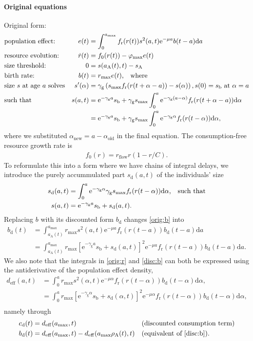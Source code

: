 \documentclass[11pt]{scrartcl}
\renewcommand{\phi}{\varphi}
\newcommand{\e}{\mathrm{e}}
\renewcommand{\d}{\mathrm{d}}
\newcommand{\bd}{b_\mathrm{d}}
\newcommand{\cd}{c_\mathrm{d}}
\newcommand{\sd}{s_\mathrm{d}}
\newcommand{\fr}{f_\mathrm{r}}
\newcommand{\rmax}{r_\mathrm{max}}
\newcommand{\amax}{{a_\mathrm{max}}}
\newcommand{\szmax}{{s_\mathrm{max}}}
\newcommand{\fmax}{\phi_\mathrm{max}}
\newcommand{\sza}{s_\mathrm{A}}
\newcommand{\szb}{s_\mathrm{b}}
\newcommand{\aA}{a_\mathrm{A}}
\newcommand{\ra}{\rho_\mathrm{A}}
\newcommand{\deff}{d_\mathrm{eff}}
\renewcommand{\gg}{\gamma_\mathrm{g}}
\begin{document}
\paragraph{Original equations}
Original form:
\begin{align}
  &\mbox{population effect:}& e(t)&=\int_0^\amax\fr(r(t))s^2(a,t)\e^{-\mu a}b(t-a)\d a\label{orig:pe}\\
  &\mbox{resource evolution:}&\dot r(t)&=f_0(r(t))-\fmax e(t)\label{orig:r}\\
  &\mbox{size threshold:}&0&=s(\aA(t),t)-\sza\label{orig:aa}\\
  &\mbox{birth rate:}&b(t)&=\rmax e(t)\label{orig:b}\mbox{,\quad where}\\
  &\mbox{size $s$ at age $a$ solves}&s'(\alpha)&=\gg \left(\szmax\fr(r(t+\alpha-a))-s(\alpha)\right),s(0)=\szb\mbox{\ at $\alpha=a$}\nonumber\\
  &\mbox{such that}&s(a,t)&=\e^{-\gg a}\szb+\gg\szmax\int_0^a\e^{-\gg(a- \alpha)}\fr(r(t+\alpha-a))\d \alpha\nonumber\\
  &&&=\e^{-\gg a}\szb+\gg\szmax\int_0^a\e^{-\gg \alpha}\fr(r(t-\alpha))\d \alpha,\label{orig:s}
\end{align}
where we substituted $\alpha_\mathrm{new}=a-\alpha_\mathrm{old}$ in
the final equation. The consumption-free resource growth rate is
\begin{align*}
  f_0(r)=r_\mathrm{flow}r(1-r/C).
\end{align*}
To reformulate this into a form where we have chains of integral
delays, we introduce the purely accummulated part $\sd(a,t)$ of the individuals' size
\begin{align*}
  \sd(a,t)&=\int_0^a\e^{-\gg \alpha}\gg\szmax\fr(r(t-\alpha))\d \alpha\mbox{,\quad such that}\\
  s(a,t)&=\e^{-\gg a}\szb+\sd(a,t)\mbox{.}
\end{align*}
Replacing $b$ with its discounted form $\bd$ changes \eqref{orig:b} into
\begin{align}\label{disc:b}
  \bd(t)&=\int_{\aA(t)}^\amax \rmax s^2(a,t)\e^{-\mu a}\fr(r(t-a))\bd(t-a)\d a\nonumber\\
  &=\int_{\aA(t)}^\amax \rmax \left[\e^{-\gg a}\szb+\sd(a,t)\right]^2\e^{-\mu a}\fr(r(t-a))\bd(t-a)\d a.
\end{align}
We also note that the integrals in \eqref{orig:r} and \eqref{disc:b}
can both be expressed using the antiderivative of the population effect density,
\begin{align*}
  \deff(a,t)&=\int_0^a\rmax s^2(\alpha,t)\e^{-\mu \alpha}\fr(r(t-\alpha))\bd(t-\alpha)\d \alpha,\\
  &=\int_0^a\rmax \left[\e^{-\gg \alpha}\szb+\sd(\alpha,t)\right]^2\e^{-\mu \alpha}\fr(r(t-\alpha))\bd(t-\alpha)\d \alpha,\\
\end{align*}
namely through
\begin{align}
  \cd(t)&=\deff(\amax,t) &&\mbox{(discounted consumption term)}\\
  \bd(t)&=\deff(\amax,t)-\deff(\amax\ra(t),t)&&\mbox{(equivalent of \eqref{disc:b}).}
\end{align}
\end{document}
